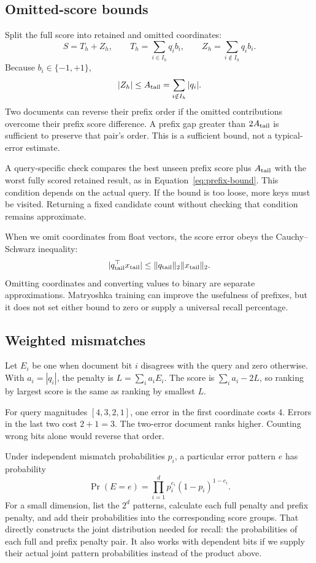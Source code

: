 \subsection{Omitted-score bounds}
Split the full score into retained and omitted coordinates:
\begin{equation}
S=T_h+Z_h,\qquad T_h=\sum_{i\in I_h}q_i b_i,\qquad
Z_h=\sum_{i\notin I_h}q_i b_i.
\end{equation}
Because $b_i\in\{-1,+1\}$,
\begin{equation}
|Z_h|\leq A_{\rm tail}=\sum_{i\notin I_h}|q_i|.
\label{eq:tail-error}
\end{equation}
Two documents can reverse their prefix order if the omitted contributions overcome their
prefix score difference. A prefix gap greater than $2A_{\rm tail}$ is sufficient to preserve
that pair's order. This is a sufficient bound, not a typical-error estimate.

A query-specific check compares the best unseen prefix score plus
$A_{\rm tail}$ with the worst fully scored retained result, as in Equation~\eqref{eq:prefix-bound}.
This condition depends on the actual query. If the bound is too loose, more keys must be visited. Returning
a fixed candidate count without checking that condition remains approximate.

When we omit coordinates from float vectors, the score error obeys the Cauchy--Schwarz inequality:
\[
|q_{\rm tail}^{\top}x_{\rm tail}|
\leq \|q_{\rm tail}\|_2\|x_{\rm tail}\|_2.
\]
Omitting coordinates and converting values to binary are separate approximations. Matryoshka training can improve
the usefulness of prefixes, but it does not set either bound to zero or supply a universal
recall percentage.

\subsection{Weighted mismatches}
Let $E_i$ be one when document bit $i$ disagrees with the query and zero otherwise. With
$a_i=|q_i|$, the penalty is $L=\sum_i a_i E_i$. The score is $\sum_i a_i-2L$, so ranking by
largest score is the same as ranking by smallest $L$.

For query magnitudes $[4,3,2,1]$, one error in the first coordinate costs 4. Errors in the
last two cost $2+1=3$. The two-error document ranks higher. Counting wrong bits alone would
reverse that order.

Under independent mismatch probabilities $p_i$, a particular error pattern $e$ has probability
\begin{equation}
\Pr(E=e)=\prod_{i=1}^{d}p_i^{e_i}(1-p_i)^{1-e_i}.
\label{eq:error-pattern-probability}
\end{equation}
For a small dimension, list the $2^d$ patterns, calculate each full penalty and prefix penalty,
and add their probabilities into the corresponding score groups. That directly constructs the
joint distribution needed for recall: the probabilities of each full and prefix penalty pair. It also works with dependent bits if we supply their
actual joint pattern probabilities instead of the product above.

